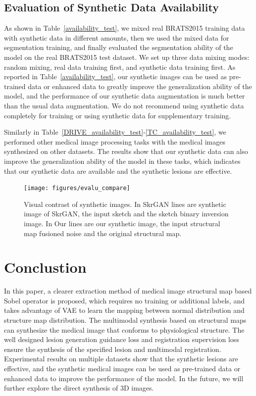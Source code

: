 \documentclass[runningheads]{llncs}
\begin{document}
	\subsection{Evaluation of Synthetic Data Availability}
	As shown in Table~\ref{availability_test}, we mixed real BRATS2015 training data with synthetic data in different amounts, then we used the mixed data for segmentation training, and finally evaluated the segmentation ability of the model on the real BRATS2015 test dataset. We set up three data mixing modes: random mixing, real data training first, and synthetic data training first. As reported in Table~\ref{availability_test}, our synthetic images can be used as pre-trained data or enhanced data to greatly improve the generalization ability of the model, and the performance of our synthetic data augmentation is much better than the usual data augmentation. We do not recommend using synthetic data completely for training or using synthetic data for supplementary training.

	Similarly in Table~\ref{DRIVE_availability_test}-\ref{TC_availability_test}, we performed other medical image processing tasks with the medical images synthesized on other datasets. The results show that our synthetic data can also improve the generalization ability of the model in these tasks, which indicates that our synthetic data are available and the synthetic lesions are effective.
	\begin{figure}[th]
		\centering
		\texttt{[image: figures/evalu\_compare]}
		\caption{Visual contrast of synthetic images. In SkrGAN lines are synthetic image of SkrGAN\cite{96zhang2019skrgan:}, the input sketch and the sketch binary inversion image. In Our lines are our synthetic image, the input structural map fusioned noise and the original structural map.}
		\label{evalu_compare}
	\end{figure}
	\section{Conclustion}
	In this paper, a clearer extraction method of medical image structural map based Sobel operator is proposed, which requires no training or additional labels, and takes advantage of VAE to learn the mapping between normal distribution and structure map distribution. The multimodal synthesis based on structural maps can synthesize the medical image that conforms to physiological structure. The well designed lesion generation guidance loss and registration supervision loss ensure the synthesis of the specified lesion and multimodal registration. Experimental results on multiple datasets show that the synthetic lesions are effective, and the synthetic medical images can be used as pre-trained data or enhanced data to improve the performance of the model. In the future, we will further explore the direct synthesis of 3D images.
	
		
\end{document}
